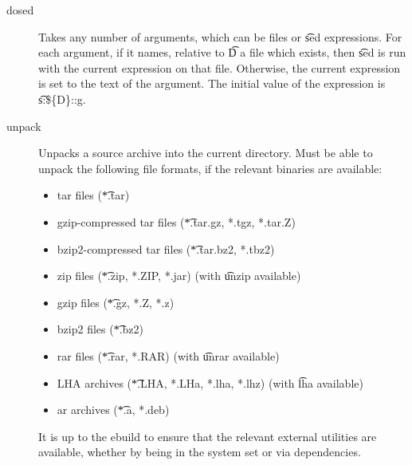 \begin{description}
\item[dosed] Takes any number of arguments, which can be files or \t{sed} expressions. For each
    argument, if it names, relative to \t{D} a file which exists, then \t{sed} is run with the
    current expression on that file. Otherwise, the current expression is set to the text of the
    argument. The initial value of the expression is \t{s:\$\{D\}::g}.
\item[unpack] Unpacks a source archive into the current directory. Must be able to unpack the
    following file formats, if the relevant binaries are available:
    \begin{itemize}
    \item tar files (\t{*.tar})
    \item gzip-compressed tar files (\t{*.tar.gz, *.tgz, *.tar.Z})
    \item bzip2-compressed tar files (\t{*.tar.bz2, *.tbz2})
    \item zip files (\t{*.zip, *.ZIP, *.jar}) (with \t{unzip} available)
    \item gzip files (\t{*.gz, *.Z, *.z})
    \item bzip2 files (\t{*.bz2})
    \item rar files (\t{*.rar, *.RAR}) (with \t{unrar} available)
    \item LHA archives (\t{*.LHA, *.LHa, *.lha, *.lhz}) (with \t{lha} available)
    \item ar archives (\t{*.a, *.deb})
    \end{itemize}
    It is up to the ebuild to ensure that the relevant external utilities are available, whether by
    being in the system set or via dependencies.
\end{description}

